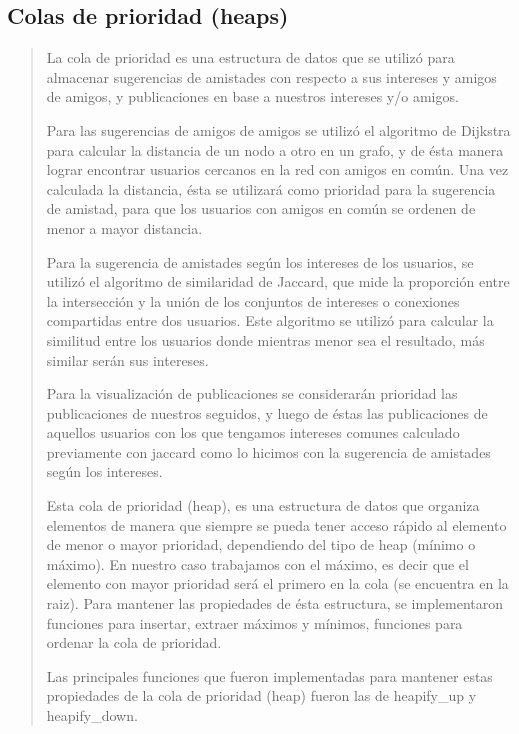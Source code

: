 \documentclass[9pt,letterpaper,onecolumn]{rho-class/rho}
\begin{document}
\subsection{Colas de prioridad (heaps)}
\begin{quote}
	La cola de prioridad es una estructura de datos que se utilizó para almacenar sugerencias de amistades con respecto a sus intereses y amigos de amigos, y publicaciones en base a nuestros intereses y/o amigos.
	
	Para las sugerencias de amigos de amigos se utilizó el algoritmo de Dijkstra para calcular la distancia de un nodo a otro en un grafo, y de ésta manera lograr encontrar usuarios cercanos en la red con amigos en común. Una vez calculada la distancia, ésta se utilizará como prioridad para la sugerencia de amistad, para que los usuarios con amigos en común se ordenen de menor a mayor distancia.
	
	Para la sugerencia de amistades según los intereses de los usuarios, se utilizó el algoritmo de similaridad de Jaccard, que mide la proporción entre la intersección y la unión de los conjuntos de intereses o conexiones compartidas entre dos usuarios. Este algoritmo se utilizó para calcular la similitud entre los usuarios donde mientras menor sea el resultado, más similar serán sus intereses.
	
	Para la visualización de publicaciones se considerarán prioridad las publicaciones de nuestros seguidos, y luego de éstas las publicaciones de aquellos usuarios con los que tengamos intereses comunes calculado previamente con jaccard como lo hicimos con la sugerencia de amistades según los intereses.
	
	Esta cola de prioridad (heap), es una estructura de datos que organiza elementos de manera que siempre se pueda tener acceso rápido al elemento de menor o mayor prioridad, dependiendo del tipo de heap (mínimo o máximo). En nuestro caso trabajamos con el máximo, es decir que el elemento con mayor prioridad será el primero en la cola (se encuentra en la raiz). Para mantener las propiedades de ésta estructura, se implementaron funciones para insertar, extraer máximos y mínimos, funciones para ordenar la cola de prioridad.
	
	Las principales funciones que fueron implementadas para mantener estas propiedades de la cola de prioridad (heap) fueron las de heapify\_up y heapify\_down.
	

\end{quote}
\end{document}
